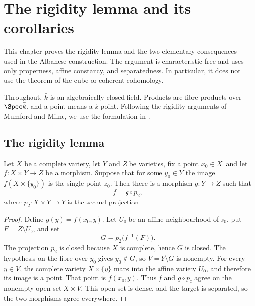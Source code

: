 \chapter{The rigidity lemma and its corollaries}
\label{chap:AbelianVarietyRigidity}
\label{chap:avr_for_rr}

This chapter proves the rigidity lemma and the two elementary consequences used in the
Albanese construction.  The argument is characteristic-free and uses only properness,
affine constancy, and separatedness.  In particular, it does not use the theorem of the
cube or coherent cohomology.

Throughout, \(\bar k\) is an algebraically closed field.  Products are fibre products over
\(\Spec \bar k\), and a point means a \(\bar k\)-point.
Following the rigidity arguments of Mumford and Milne, we use the formulation in
\cite{mumford-av,milne-av}.

\section{The rigidity lemma}

\begin{lemma}
  \label{thm:rigidity_lemma}
  \leanok
  Let \(X\) be a complete variety, let \(Y\) and \(Z\) be varieties, fix a point
  \(x_0\in X\), and let \(f \colon X \times Y \to Z\) be a morphism.  Suppose that
  for some \(y_0 \in Y\) the image \(f(X \times \{y_0\})\) is the single point
  \(z_0\).  Then there is a morphism \(g \colon Y \to Z\) such that
  \[
    f = g \circ p_2,
  \]
  where \(p_2 \colon X \times Y \to Y\) is the second projection.
\end{lemma}
\begin{proof}
  \leanok
  Define \(g(y)=f(x_0,y)\).  Let \(U_0\) be an affine
  neighbourhood of \(z_0\), put \(F=Z\setminus U_0\), and set
  \[
    G=p_2\bigl(f^{-1}(F)\bigr).
  \]
  The projection \(p_2\) is closed because \(X\) is complete, hence \(G\) is closed.
  The hypothesis on the fibre over \(y_0\) gives \(y_0\notin G\), so
  \(V=Y\setminus G\) is nonempty.  For every \(y\in V\), the complete variety
  \(X\times\{y\}\) maps into the affine variety \(U_0\), and therefore its image is
  a point.  That point is \(f(x_0,y)\).  Thus \(f\) and \(g\circ p_2\) agree on the
  nonempty open set \(X\times V\).  This open set is dense, and the target is
  separated, so the two morphisms agree everywhere.
\end{proof}

